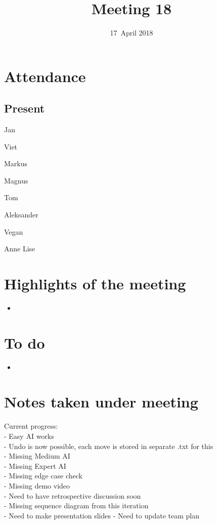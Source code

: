 \documentclass[letterpaper,11pt]{article}
\title{Meeting 18}
\date{17~April 2018}
\begin{document}
\maketitle
\section*{Attendance}
\subsection*{Present}
\begin{list}{}{}
	\item Jan
	\item Viet
	\item Markus
	\item Magnus
	\item Tom
	\item Aleksander
	\item Vegan
	\item Anne Lise
\end{list}

\newpage
\section*{Highlights of the meeting}
\begin{itemize}
	\item 
\end{itemize}

\section*{To do}
\begin{itemize}
	\item 
\end{itemize}

\section*{Notes taken under meeting}
Current progress:\\
- Easy AI works\\
- Undo is now possible, each move is stored in separate .txt for this\\
- Missing Medium AI\\
- Missing Expert AI\\
- Missing edge case check\\
- Missing demo video\\
- Need to have retrospective discussion soon\\
- Missing sequence diagram from this iteration\\
- Need to make presentation slides
- Need to update team plan
\end{document}
